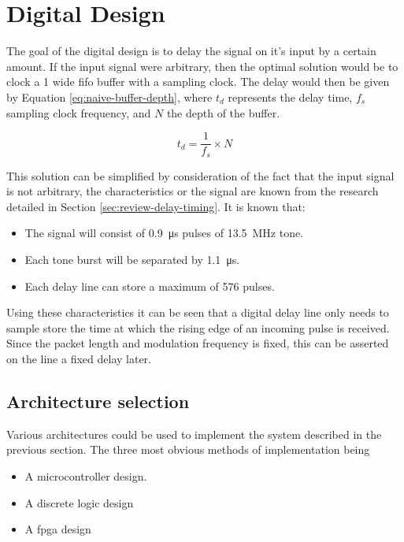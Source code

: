 \section{Digital Design} \label{sec:delay-line-dig-des}

The goal of the digital design is to delay the signal on it's input by a certain amount. If the input signal were arbitrary, then the optimal solution would be to clock a \SI{1}{\bit} wide \gls{fifo} buffer with a sampling clock. The delay would then be given by Equation \ref{eq:naive-buffer-depth}, where $t_d$ represents the delay time, $f_s$ sampling clock frequency, and $N$ the depth of the buffer.

\begin{equation}
	t_d = \frac{1}{f_s} \times N \label{eq:naive-buffer-depth}
\end{equation}

This solution can be simplified by consideration of the fact that the input signal is not arbitrary, the characteristics or the signal are known from the research detailed in Section \ref{sec:review-delay-timing}. It is known that:
\begin{itemize}
	\item The signal will consist of \SI{0.9}{\micro\second} pulses of \SI{13.5}{\mega\hertz} tone.
	\item Each tone burst will be separated by \SI{1.1}{\micro\second}.
	\item Each delay line can store a maximum of 576 pulses.
\end{itemize}

Using these characteristics it can be seen that a digital delay line only needs to sample store the time at which the rising edge of an incoming pulse is received. Since the packet length and modulation frequency is fixed, this can be asserted on the line a fixed delay later.

\subsection{Architecture selection}

Various architectures could be used to implement the system described in the previous section. The three most obvious methods of implementation being
\begin{itemize}
	\item A microcontroller design.
	\item A discrete logic design
	\item A \gls{fpga} design
\end{itemize}

